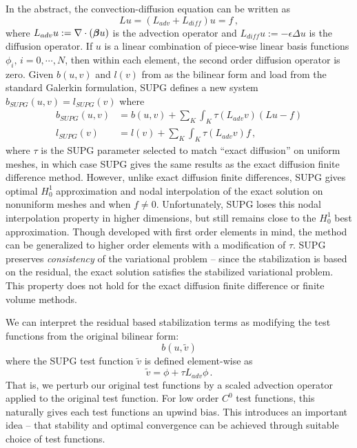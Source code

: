 \documentclass[Dissertation.tex]{subfiles}
\begin{document}
In the abstract, the convection-diffusion equation can be written as
\[
Lu=(L_{adv}+L_{diff})u=f\,,
\]
where $L_{adv}u:=\nabla\cdot(\boldsymbol\beta u)$ is the advection operator and $L_{diff}u:=-\epsilon\Delta u$ is the diffusion operator.
If $u$ is a linear combination of piece-wise linear basis functions $\phi_i,\,i=0,\cdots,N$, then within each element, the second order diffusion operator is zero.
Given $b(u,v)$ and $l(v)$ from as the bilinear form and load from the standard Galerkin formulation, SUPG defines a new system $b_{SUPG}(u,v)=l_{SUPG}(v)$ where
\begin{align*}
	b_{SUPG}(u,v)&=b(u,v)+\sum_K\int_K\tau(L_{adv}v)(Lu-f)\\
	l_{SUPG}(v)&=l(v)+\sum_K\int_K\tau(L_{adv}v)f\,,
\end{align*}
where $\tau$ is the SUPG parameter selected to match ``exact diffusion'' on uniform meshes, in which case SUPG gives the same results as the
exact diffusion finite difference method.
However, unlike exact diffusion finite differences, SUPG gives optimal $H_0^1$ approximation and nodal interpolation of the exact solution
on nonuniform meshes and when $f\neq0$.
Unfortunately, SUPG loses this nodal interpolation property in higher dimensions, but still remains close to the $H_0^1$ best approximation.
Though developed with first order elements in mind, the method can be generalized to higher order elements with a modification of $\tau$.
SUPG preserves \emph{consistency} of the variational problem -- since the stabilization is based on the residual, the exact solution
satisfies the stabilized variational problem.
This property does not hold for the exact diffusion finite difference or finite volume methods.

We can interpret the residual based stabilization terms as modifying the test functions from the original bilinear form:
\[
b(u,\tilde v)
\]
where the SUPG test function $\tilde v$ is defined element-wise as
\[
\tilde v=\phi+\tau L_{adv}\phi\,.
\]
That is, we perturb our original test functions by a scaled advection operator applied to the original test function.
For low order $C^0$ test functions, this naturally gives each test functions an upwind bias.
This introduces an important idea -- that stability and optimal convergence can be achieved through suitable choice of test functions.
\end{document}
